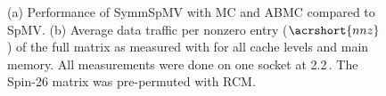 \begin{figure}[tbp]
  	\centering
    \hspace{1em}
  	
  	\caption{(a) Performance of \acrshort{SymmSpMV} with \acrshort{MC} and \acrshort{ABMC} compared to \acrshort{SpMV}. (b) Average data traffic per nonzero entry ($\acrshort{nnz}$) of the full matrix as measured with \LIKWID for all cache levels and main memory. All measurements were done on one \IVB socket at 2.2\,\GHZ. The Spin-26 matrix was pre-permuted with \acrshort{RCM}. }
  	\label{fig:motivation}
  \end{figure}
 
